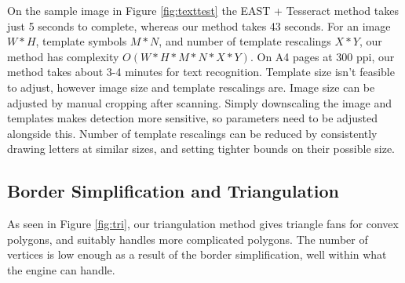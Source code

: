 \documentclass[11pt]{IEEEtran}
\begin{document}
On the sample image in Figure \ref{fig:texttest} the EAST + Tesseract method takes just 5 seconds to complete, whereas our method takes 43 seconds. For an image $W*H$, template symbols $M*N$, and number of template rescalings $X*Y$, our method has complexity $O(W*H*M*N*X*Y)$. On A4 pages at 300 ppi, our method takes about 3-4 minutes for text recognition. Template size isn't feasible to adjust, however image size and template rescalings are. Image size can be adjusted by manual cropping after scanning. Simply downscaling the image and templates makes detection more sensitive, so parameters need to be adjusted alongside this. Number of template rescalings can be reduced by consistently drawing letters at similar sizes, and setting tighter bounds on their possible size.

\subsection{Border Simplification and Triangulation}

As seen in Figure \ref{fig:tri}, our triangulation method gives triangle fans for convex polygons, and suitably handles more complicated polygons. The number of vertices is low enough as a result of the border simplification, well within what the engine can handle.
\end{document}
